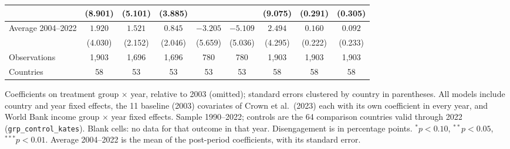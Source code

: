 \begin{table}[htbp]
{\begin{tabular}{lcccccccc}
 & (8.901) & (5.101) & (3.885) &  &  & (9.075) & (0.291) & (0.305) \\
\midrule
Average 2004--2022 & $1.920$ & $1.521$ & $0.845$ & $-3.205$ & $-5.109$ & $2.494$ & $0.160$ & $0.092$ \\
 & (4.030) & (2.152) & (2.046) & (5.659) & (5.036) & (4.295) & (0.222) & (0.233) \\
Observations & 1,903 & 1,696 & 1,696 & 780 & 780 & 1,903 & 1,903 & 1,903 \\
Countries & 58 & 53 & 53 & 53 & 53 & 58 & 58 & 58 \\
\bottomrule
\end{tabular}}
\par\vspace{4pt}
\begin{minipage}{\textwidth}\footnotesize Coefficients on treatment group $\times$ year, relative to 2003 (omitted); standard errors clustered by country in parentheses. All models include country and year fixed effects, the 11 baseline (2003) covariates of Crown et al.\ (2023) each with its own coefficient in every year, and World Bank income group $\times$ year fixed effects. Sample 1990--2022; controls are the 64 comparison countries valid through 2022 (\texttt{grp\_control\_kates}). Blank cells: no data for that outcome in that year. Disengagement is in percentage points. $^{*}p<0.10$, $^{**}p<0.05$, $^{***}p<0.01$. Average 2004--2022 is the mean of the post-period coefficients, with its standard error.\end{minipage}
\end{table}
